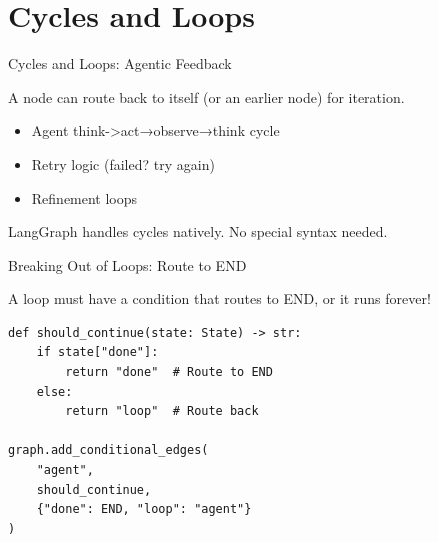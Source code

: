 \documentclass[aspectratio=169,11pt]{beamer}
\begin{document}
\section{Cycles and Loops}
\begin{frame}[t]{Cycles and Loops: Agentic Feedback}
\setlength{\itemsep}{1pt}
\vspace{0.1cm}

\begin{conceptbox}
A node can route back to itself (or an earlier node) for iteration.
\end{conceptbox}

\vspace{0.15cm}

\begin{tipbox}
\setlength{\itemsep}{1pt}
\begin{itemize}
  \item Agent think->act→observe→think cycle
  \item Retry logic (failed? try again)
  \item Refinement loops
\end{itemize}
\end{tipbox}

\vspace{0.15cm}

{\footnotesize LangGraph handles cycles natively. No special syntax needed.}
\end{frame}

\begin{frame}[fragile,t]{Breaking Out of Loops: Route to END}
\vspace{0.1cm}

\begin{conceptbox}
A loop must have a condition that routes to END, or it runs forever!
\end{conceptbox}

\vspace{0.1cm}

\begin{codebox}
\begin{lstlisting}
def should_continue(state: State) -> str:
    if state["done"]:
        return "done"  # Route to END
    else:
        return "loop"  # Route back

graph.add_conditional_edges(
    "agent",
    should_continue,
    {"done": END, "loop": "agent"}
)
\end{lstlisting}
\end{codebox}
\end{frame}
\end{document}
